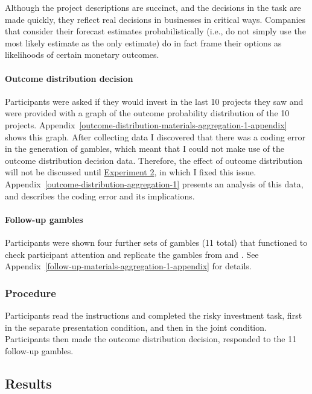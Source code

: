 \documentclass[a4paper, nobind, dvipsnames]{templates/ociamthesis}
\theoremstyle{definition}
\theoremstyle{definition}
\theoremstyle{definition}
\theoremstyle{definition}
\theoremstyle{remark}
\begin{document}
Although the project descriptions are succinct, and the decisions in the task
are made quickly, they reflect real decisions in businesses in critical ways.
Companies that consider their forecast estimates probabilistically (i.e., do not
simply use the most likely estimate as the only estimate) do in fact frame their
options as likelihoods of certain monetary outcomes.

\hypertarget{outcome-distribution-materials-aggregation-1}{%
\paragraph{Outcome distribution decision}\label{outcome-distribution-materials-aggregation-1}}

Participants were asked if they would invest in the last 10 projects they saw
and were provided with a graph of the outcome probability distribution of the 10
projects. Appendix~\ref{outcome-distribution-materials-aggregation-1-appendix}
shows this graph. After collecting data I discovered that there was a coding
error in the generation of gambles, which meant that I could not make use of the
outcome distribution decision data. Therefore, the effect of outcome
distribution will not be discussed until \protect\hyperlink{aggregation-2}{Experiment 2}, in
which I fixed this issue. Appendix~\ref{outcome-distribution-aggregation-1}
presents an analysis of this data, and describes the coding error and its
implications.

\paragraph{Follow-up gambles}

Participants were shown four further sets of gambles (11 total) that functioned
to check participant attention and replicate the gambles from \textcite{samuelson1963} and
\textcite{redelmeier1992}. See Appendix~\ref{follow-up-materials-aggregation-1-appendix}
for details.

\subsubsection{Procedure}

Participants read the instructions and completed the risky investment task,
first in the separate presentation condition, and then in the joint condition.
Participants then made the outcome distribution decision, responded to the 11
follow-up gambles.

\hypertarget{results-aggregation-1}{%
\subsection{Results}\label{results-aggregation-1}}
\end{document}
